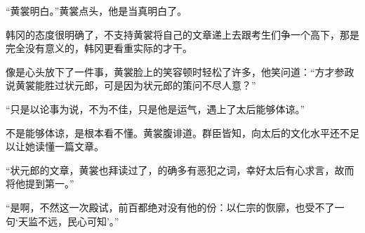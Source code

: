 “黄裳明白。”黄裳点头，他是当真明白了。

韩冈的态度很明确了，不支持黄裳将自己的文章递上去跟考生们争一个高下，那是完全没有意义的，韩冈更看重实际的才干。

像是心头放下了一件事，黄裳脸上的笑容顿时轻松了许多，他笑问道：“方才参政说黄裳能胜过状元郎，可是因为状元郎的策问不尽人意？”

“只是以论事为说，不为不佳，只是他是运气，遇上了太后能够体谅。”

不是能够体谅，是根本看不懂。黄裳腹诽道。群臣皆知，向太后的文化水平还不足以让她读懂一篇文章。

“状元郎的文章，黄裳也拜读过了，的确多有恶犯之词，幸好太后有心求言，故而将他提到第一。”

“是啊，不然这一次殿试，前百都绝对没有他的份：以仁宗的恢廓，也受不了一句‘天监不远，民心可知’。”
